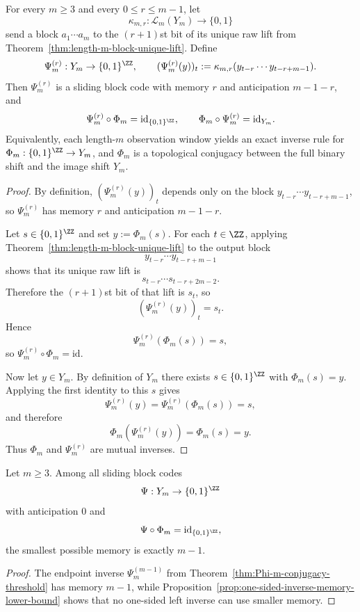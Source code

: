 \begin{theorem}
\label{thm:Phi-m-conjugacy-threshold}
For every $m\ge 3$ and every $0\le r\le m-1$, let
\[
\kappa_{m,r}:\mathcal L_m(Y_m)\to\{0,1\}
\]
send a block $a_1\cdots a_m$ to the $(r+1)$st bit of its unique raw lift from
Theorem~\ref{thm:length-m-block-unique-lift}.  Define
\[
\Psi_m^{(r)}:Y_m\to\{0,1\}^{\ZZ},
\qquad
(\Psi_m^{(r)}(y))_t:=\kappa_{m,r}(y_{t-r}\cdots y_{t-r+m-1}).
\]
Then $\Psi_m^{(r)}$ is a sliding block code with memory $r$ and anticipation
$m-1-r$, and
\[
\Psi_m^{(r)}\circ\Phi_m=\mathrm{id}_{\{0,1\}^{\ZZ}},
\qquad
\Phi_m\circ\Psi_m^{(r)}=\mathrm{id}_{Y_m}.
\]
Equivalently, each length-$m$ observation window yields an exact inverse rule
for $\Phi_m:\{0,1\}^{\ZZ}\to Y_m$, and $\Phi_m$ is a topological conjugacy
between the full binary shift and the image shift $Y_m$.
\end{theorem}

\begin{proof}
By definition, $(\Psi_m^{(r)}(y))_t$ depends only on the block
$y_{t-r}\cdots y_{t-r+m-1}$, so $\Psi_m^{(r)}$ has memory $r$ and anticipation
$m-1-r$.

Let $s\in\{0,1\}^{\ZZ}$ and set $y:=\Phi_m(s)$.  For each $t\in\ZZ$, applying
Theorem~\ref{thm:length-m-block-unique-lift} to the output block
\[
y_{t-r}\cdots y_{t-r+m-1}
\]
shows that its unique raw lift is
\[
s_{t-r}\cdots s_{t-r+2m-2}.
\]
Therefore the $(r+1)$st bit of that lift is $s_t$, so
\[
(\Psi_m^{(r)}(y))_t=s_t.
\]
Hence
\[
\Psi_m^{(r)}(\Phi_m(s))=s,
\]
so $\Psi_m^{(r)}\circ\Phi_m=\mathrm{id}$.

Now let $y\in Y_m$.  By definition of $Y_m$ there exists
$s\in\{0,1\}^{\ZZ}$ with $\Phi_m(s)=y$.  Applying the first identity to this
$s$ gives
\[
\Psi_m^{(r)}(y)=\Psi_m^{(r)}(\Phi_m(s))=s,
\]
and therefore
\[
\Phi_m(\Psi_m^{(r)}(y))=\Phi_m(s)=y.
\]
Thus $\Phi_m$ and $\Psi_m^{(r)}$ are mutual inverses.
\end{proof}

\begin{corollary}
\label{cor:Phi-m-memory-threshold-exact}
Let $m\ge 3$.  Among all sliding block codes
\[
\Psi:Y_m\to\{0,1\}^{\ZZ}
\]
with anticipation $0$ and
\[
\Psi\circ\Phi_m=\mathrm{id}_{\{0,1\}^{\ZZ}},
\]
the smallest possible memory is exactly $m-1$.
\end{corollary}

\begin{proof}
The endpoint inverse $\Psi_m^{(m-1)}$ from
Theorem~\ref{thm:Phi-m-conjugacy-threshold} has memory $m-1$, while
Proposition~\ref{prop:one-sided-inverse-memory-lower-bound} shows that no
one-sided left inverse can use smaller memory.
\end{proof}
